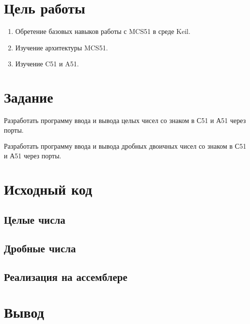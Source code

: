 
\isonefalse
\def \labnum {2}
\def \labsubj {Организация ЭВМ и систем}
\def \labauthor {Айтуганов Д. А. \\ Чебыкин И. Б.}
\def \labgroup {P3301}
\def \labinsp {Скорубский В. И.}
\def \labname {}

\isnametrue
\lstset{
	caption=\lstname,
	basicstyle=\ttfamily\selectfont\scriptsize
}


\section*{Цель работы}
\begin{enumerate}
	\item Обретение базовых навыков работы с MCS51 в среде Keil.
	\item Изучение архитектуры MCS51.
	\item Изучение C51 и A51.
\end{enumerate}
\section*{Задание}
Разработать программу ввода и вывода целых чисел со знаком в С51 и А51
через порты.

Разработать программу ввода и вывода дробных двоичных чисел со знаком в
С51 и А51 через порты.
\section*{Исходный код}
\subsection*{Целые числа}


\subsection*{Дробные числа}


\subsection*{Реализация на ассемблере}



\section*{Вывод}


